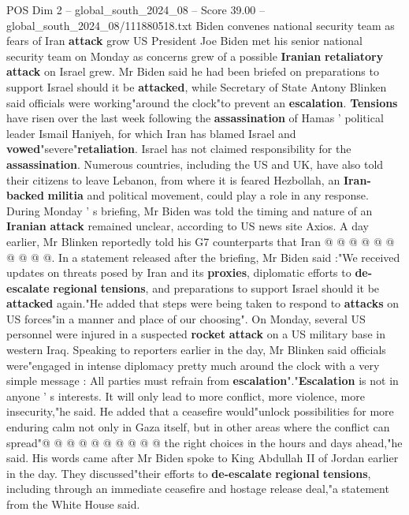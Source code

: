 \begin{textsample}{POS Dim 2 – global\_south\_2024\_08 – Score 39.00 – global\_south\_2024\_08/111880518.txt}  \label{ex:f2_pos_001}
Biden convenes national security team as fears of Iran \textbf{attack} grow US President Joe Biden met his senior national security team on Monday as concerns grew of a possible \textbf{Iranian} \textbf{retaliatory} \textbf{attack} on Israel grew.
Mr Biden said he had been briefed on preparations to support Israel should it be \textbf{attacked}, while Secretary of State Antony Blinken said officials were working"around the clock"to prevent an \textbf{escalation}. \textbf{Tensions} have risen over the last week following the \textbf{assassination} of Hamas ' political leader Ismail Haniyeh, for which Iran has blamed Israel and \textbf{vowed}"severe"\textbf{retaliation}.
Israel has not claimed responsibility for the \textbf{assassination}.
Numerous countries, including the US and UK, have also told their citizens to leave Lebanon, from where it is feared Hezbollah, an \textbf{Iran-backed} \textbf{militia} and political movement, could play a role in any response.
During Monday ' s briefing, Mr Biden was told the timing and nature of an \textbf{Iranian} \textbf{attack} remained unclear, according to US news site Axios.
A day earlier, Mr Blinken reportedly told his G7 counterparts that Iran @ @ @ @ @ @ @ @ @ @.
In a statement released after the briefing, Mr Biden said :"We received updates on threats posed by Iran and its \textbf{proxies}, diplomatic efforts to \textbf{de-escalate} \textbf{regional} \textbf{tensions}, and preparations to support Israel should it be \textbf{attacked} again."He added that steps were being taken to respond to \textbf{attacks} on US forces"in a manner and place of our choosing".
On Monday, several US personnel were injured in a suspected \textbf{rocket} \textbf{attack} on a US military base in western Iraq.
Speaking to reporters earlier in the day, Mr Blinken said officials were"engaged in intense diplomacy pretty much around the clock with a very simple message : All parties must refrain from \textbf{escalation}"."\textbf{Escalation} is not in anyone ' s interests.
It will only lead to more conflict, more violence, more insecurity,"he said.
He added that a ceasefire would"unlock possibilities for more enduring calm not only in Gaza itself, but in other areas where the conflict can spread"@ @ @ @ @ @ @ @ @ @ the right choices in the hours and days ahead,"he said.
His words came after Mr Biden spoke to King Abdullah II of Jordan earlier in the day.
They discussed"their efforts to \textbf{de-escalate} \textbf{regional} \textbf{tensions}, including through an immediate ceasefire and hostage release deal,"a statement from the White House said.

\end{textsample}

